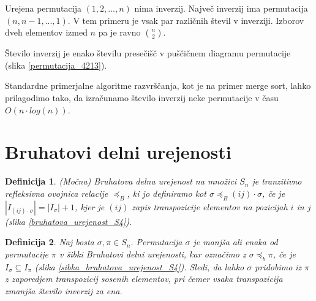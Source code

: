 \documentclass[a4paper, 12pt]{book}
\newtheorem{definicija}{Definicija}[chapter]
\begin{document}
Urejena permutacija $(1, 2, ..., n)$ nima inverzij. Največ inverzij ima permutacija $(n, n-1, ..., 1)$. V tem primeru je vsak par različnih števil v inverziji. Izborov dveh elementov izmed $n$ pa je ravno $\binom{n}{2}$.

Število inverzij je enako številu presečišč v puščičnem diagramu permutacije (slika \ref{permutacija_4213}).

Standardne primerjalne algoritme razvrščanja, kot je na primer merge sort, lahko prilagodimo tako, da izračunamo število inverzij neke permutacije v času $O(n \cdot log(n))$.

\section{ Bruhatovi delni urejenosti }

\begin{definicija}    
    (Močna) Bruhatova  delna urejenost na množici $S_n$ je tranzitivno refleksivna ovojnica relacije $\preceq_{B}$, ki jo definiramo kot $\sigma \preceq_{B} (ij) \cdot \sigma$, če je $|I_{(ij) \cdot \sigma}| = |I_{\sigma}| + 1$, kjer je $(ij)$ zapis transpozicije elementov na pozicijah $i$ in $j$ (slika \ref{bruhatova_urejenost_S4}).
\end{definicija}

\begin{definicija}
Naj bosta $\sigma, \pi \in S_n$. Permutacija $\sigma$ je manjša ali enaka od permutacije $\pi$ v šibki Bruhatovi delni urejenosti, kar označimo z $\sigma \preceq_b \pi$, če je $I_{\sigma} \subseteq I_{\pi}$ (slika \ref{sibka_bruhatova_urejenost_S4}). Sledi, da lahko $\sigma$ pridobimo iz $\pi$ z zaporedjem transpozicij sosenih elementov, pri čemer vsaka transpozicija zmanjša število inverzij za ena.
\end{definicija}
\end{document}
